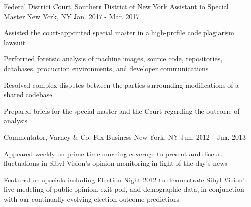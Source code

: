 \begin{cventries}
  \cventry
    {Federal District Court, Southern District of New York} %
    {Assistant to Special Master} %
    {New York, NY} %
    {Jan. 2017 - Mar. 2017} %
    {
      \begin{cvitems} %
		\item {Assisted the court-appointed special master in a high-profile code plagiarism lawsuit}
      	\item {Performed forensic analysis of machine images, source code, repositories, databases, production environments, and developer communications}
      	\item {Resolved complex disputes between the parties surrounding modifications of a shared codebase}
      	\item {Prepared briefs for the special master and the Court regarding the outcome of analysis}
      \end{cvitems}
    }

  \cventry
    {Commentator, Varney \& Co.} %
    {Fox Business} %
    {New York, NY} %
    {Jun. 2012 - Jun. 2013} %
    {
      \begin{cvitems} %
      	\item {Appeared weekly on prime time morning coverage to present and discuss fluctuations in Sibyl Vision's opinion monitoring in light of the day's news}
      	\item {Featured on specials including Election Night 2012 to demonstrate Sibyl Vision's live modeling of public opinion, exit poll, and demographic data, in conjunction with our continually evolving election outcome predictions}
      \end{cvitems}
    }

    

\end{cventries}
